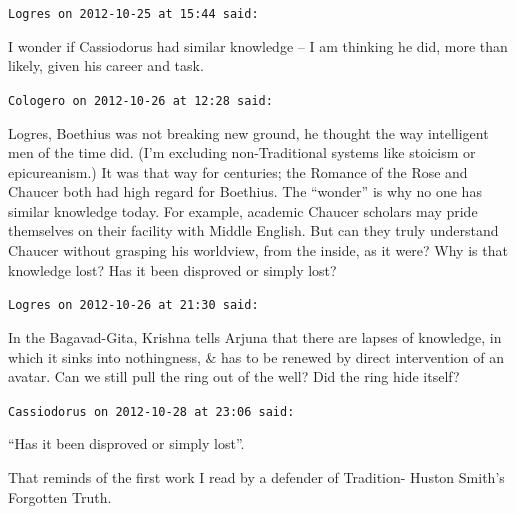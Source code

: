 \begin{footnotesize}\begin{sffamily}



\texttt{Logres on 2012-10-25 at 15:44 said: }

I wonder if Cassiodorus had similar knowledge – I am thinking he did, more than likely, given his career and task.


\hfill

\texttt{Cologero on 2012-10-26 at 12:28 said: }

Logres, Boethius was not breaking new ground, he thought the way intelligent men of the time did. (I'm excluding non-Traditional systems like stoicism or epicureanism.) It was that way for centuries; the Romance of the Rose and Chaucer both had high regard for Boethius. The “wonder” is why no one has similar knowledge today. For example, academic Chaucer scholars may pride themselves on their facility with Middle English. But can they truly understand Chaucer without grasping his worldview, from the inside, as it were? Why is that knowledge lost? Has it been disproved or simply lost?


\hfill

\texttt{Logres on 2012-10-26 at 21:30 said: }

In the Bagavad-Gita, Krishna tells Arjuna that there are lapses of knowledge, in which it sinks into nothingness, \& has to be renewed by direct intervention of an avatar. Can we still pull the ring out of the well? Did the ring hide itself?


\hfill

\texttt{Cassiodorus on 2012-10-28 at 23:06 said: }

“Has it been disproved or simply lost”.

That reminds of the first work I read by a defender of Tradition- Huston Smith's Forgotten Truth.


\end{sffamily}\end{footnotesize}
